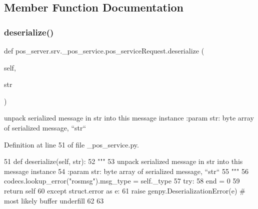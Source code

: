 \subsection{Member Function Documentation}
\mbox{\label{classpos__server_1_1srv_1_1__pos__service_1_1pos__serviceRequest_ac92c71439be77efb0e87776f14611402}} 
\subsubsection{\texorpdfstring{deserialize()}{deserialize()}}
{\footnotesize\ttfamily def pos\+\_\+server.\+srv.\+\_\+pos\+\_\+service.\+pos\+\_\+service\+Request.\+deserialize (\begin{DoxyParamCaption}\item[{}]{self,  }\item[{}]{str }\end{DoxyParamCaption})}

\begin{DoxyVerb}unpack serialized message in str into this message instance
:param str: byte array of serialized message, ``str``
\end{DoxyVerb}
 

Definition at line 51 of file \+\_\+pos\+\_\+service.\+py.


\begin{DoxyCode}
51   \textcolor{keyword}{def }deserialize(self, str):
52     \textcolor{stringliteral}{"""}
53 \textcolor{stringliteral}{    unpack serialized message in str into this message instance}
54 \textcolor{stringliteral}{    :param str: byte array of serialized message, ``str``}
55 \textcolor{stringliteral}{    """}
56     codecs.lookup\_error(\textcolor{stringliteral}{"rosmsg"}).msg\_type = self.\_type
57     \textcolor{keywordflow}{try}:
58       end = 0
59       \textcolor{keywordflow}{return} self
60     \textcolor{keywordflow}{except} struct.error \textcolor{keyword}{as} e:
61       \textcolor{keywordflow}{raise} genpy.DeserializationError(e)  \textcolor{comment}{# most likely buffer underfill}
62 
63 
\end{DoxyCode}
\mbox{\label{classpos__server_1_1srv_1_1__pos__service_1_1pos__serviceRequest_ad588ea48fd0cfd110600d268afb3cf24}} 
